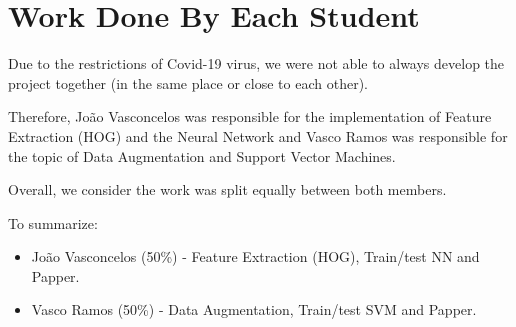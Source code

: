 \section*{Work Done By Each Student}
Due to the restrictions of Covid-19 virus, we were not able to always develop the project together (in the same place or close to each other).

Therefore, João Vasconcelos was responsible for the implementation of Feature Extraction (HOG) and the Neural Network and Vasco Ramos was responsible for the topic of Data Augmentation and Support Vector Machines.

Overall, we consider the work was split equally between both members.

To summarize:

\begin{itemize} 
\item João Vasconcelos (50\%) - Feature Extraction (HOG), Train/test NN and Papper.
\item Vasco Ramos (50\%) - Data Augmentation, Train/test SVM and Papper.
\end{itemize}